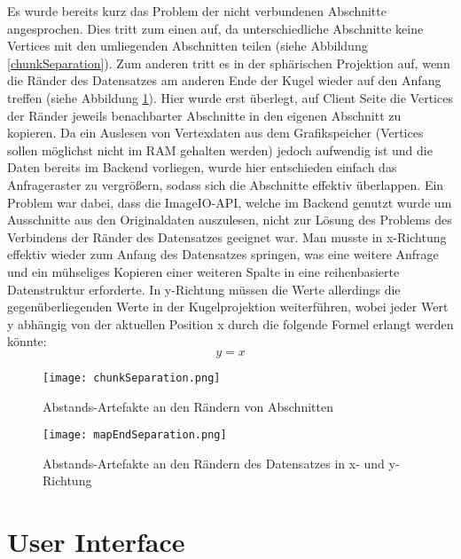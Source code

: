 Es wurde bereits kurz das Problem der nicht verbundenen Abschnitte angesprochen. Dies tritt zum einen auf, da unterschiedliche Abschnitte keine Vertices mit den umliegenden Abschnitten teilen (siehe Abbildung \ref{chunkSeparation}). Zum anderen tritt es in der sphärischen Projektion auf, wenn die Ränder des Datensatzes am anderen Ende der Kugel wieder auf den Anfang treffen (siehe Abbildung \ref{mapEndSeparation}). Hier wurde erst überlegt, auf Client Seite die Vertices der Ränder jeweils benachbarter Abschnitte in den eigenen Abschnitt zu kopieren. Da ein Auslesen von Vertexdaten aus dem Grafikspeicher (Vertices sollen möglichst nicht im RAM gehalten werden) jedoch aufwendig ist und die Daten bereits im Backend vorliegen, wurde hier entschieden einfach das Anfrageraster zu vergrößern, sodass sich die Abschnitte effektiv überlappen. Ein Problem war dabei, dass die ImageIO-API, welche im Backend genutzt wurde um Ausschnitte aus den Originaldaten auszulesen, nicht zur Lösung des Problems des Verbindens der Ränder des Datensatzes geeignet war. Man musste in x-Richtung effektiv wieder zum Anfang des Datensatzes springen, was eine weitere Anfrage und ein mühseliges Kopieren einer weiteren Spalte in eine reihenbasierte Datenstruktur erforderte. In y-Richtung müssen die Werte allerdings die gegenüberliegenden Werte in der Kugelprojektion weiterführen, wobei jeder Wert y abhängig von der aktuellen Position x durch die folgende Formel erlangt werden könnte: \[y = x\]



\begin{figure}[!tbp] 
  \centering
  \begin{minipage}[b]{0.4\textwidth}
    \texttt{[image: chunkSeparation.png]}
    \caption{Abstands-Artefakte an den Rändern von Abschnitten}
    \label{chunkSeparation}
  \end{minipage}
  \hfill
  \begin{minipage}[b]{0.4\textwidth}
    \texttt{[image: mapEndSeparation.png]}
    \caption{Abstands-Artefakte an den Rändern des Datensatzes in x- und y-Richtung}
    \label{mapEndSeparation}
  \end{minipage}
\end{figure}

\section{User Interface}


